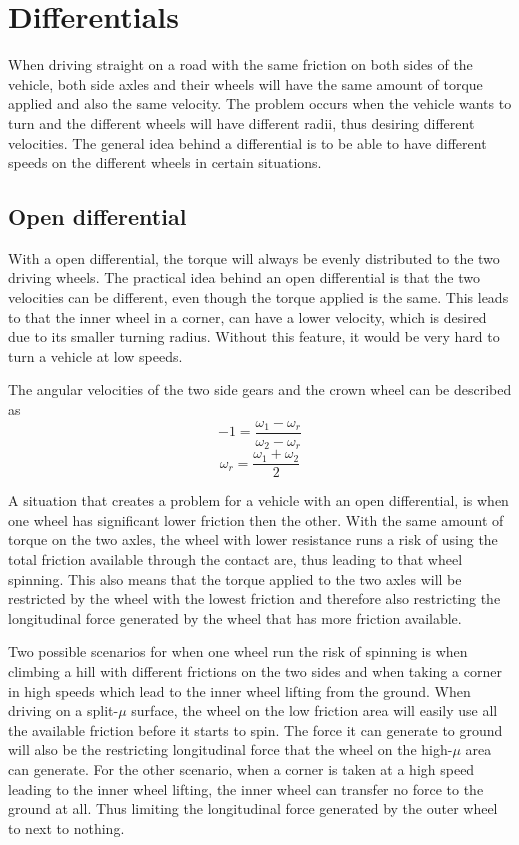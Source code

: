 \section{Differentials}

When driving straight on a road with the same friction on both sides of the vehicle, both side axles and their wheels will have the same amount of torque applied and also the same velocity. The problem occurs when the vehicle wants to turn and the different wheels will have different radii, thus desiring different velocities. The general idea behind a differential is to be able to have different speeds on the different wheels in certain situations.

\subsection{Open differential}

With a open differential, the torque will always be evenly distributed to the two driving wheels. The practical idea behind an open differential is that the two velocities can be different, even though the torque applied is the same. This leads to that the inner wheel in a corner, can have a lower velocity, which is desired due to its smaller turning radius. Without this feature, it would be very hard to turn a vehicle at low speeds. 

The angular velocities of the two side gears and the crown wheel can be described as
\begin{equation}
-1 = \frac{\omega_{1} - \omega_{r}}{\omega_{2} - \omega_{r}}
\end{equation}
\begin{equation}
\omega_{r} = \frac{\omega_{1} + \omega_{2}}{2}
\end{equation}

A situation that creates a problem for a vehicle with an open differential, is when one wheel has significant lower friction then the other. With the same amount of torque on the two axles, the wheel with lower resistance runs a risk of using the total friction available through the contact are, thus leading to that wheel spinning. This also means that the torque applied to the two axles will be restricted by the wheel with the lowest friction and therefore also restricting the longitudinal force generated by the wheel that has more friction available.

Two possible scenarios for when one wheel run the risk of spinning is when climbing a hill with different frictions on the two sides and when taking a corner in high speeds which lead to the inner wheel lifting from the ground. When driving on a split-$ \mu $ surface, the wheel on the low friction area will easily use all the available friction before it starts to spin. The force it can generate to ground will also be the restricting longitudinal force that the wheel on the high-$ \mu $ area can generate. For the other scenario, when a corner is taken at a high speed leading to the inner wheel lifting, the inner wheel can transfer no force to the ground at all. Thus limiting the longitudinal force generated by the outer wheel to next to nothing. 

